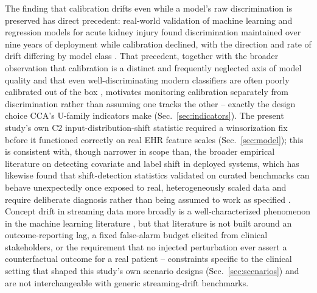 \documentclass[apajournal,article,submit,oneauthor]{Definitions/mdpi}
\begin{document}
The finding that calibration drifts even while a model's raw discrimination is preserved has direct precedent: real-world validation of machine learning and regression models for acute kidney injury found discrimination maintained over nine years of deployment while calibration declined, with the direction and rate of drift differing by model class \citep{davis2017}. That precedent, together with the broader observation that calibration is a distinct and frequently neglected axis of model quality \citep{vancalster2019} and that even well-discriminating modern classifiers are often poorly calibrated out of the box \citep{guo2017}, motivates monitoring calibration separately from discrimination rather than assuming one tracks the other -- exactly the design choice CCA's U-family indicators make (Sec.~\ref{sec:indicators}). The present study's own C2 input-distribution-shift statistic required a winsorization fix before it functioned correctly on real EHR feature scales (Sec.~\ref{sec:model}); this is consistent with, though narrower in scope than, the broader empirical literature on detecting covariate and label shift in deployed systems, which has likewise found that shift-detection statistics validated on curated benchmarks can behave unexpectedly once exposed to real, heterogeneously scaled data and require deliberate diagnosis rather than being assumed to work as specified \citep{rabanser2019}. Concept drift in streaming data more broadly is a well-characterized phenomenon in the machine learning literature \citep{gama2014,lu2019}, but that literature is not built around an outcome-reporting lag, a fixed false-alarm budget elicited from clinical stakeholders, or the requirement that no injected perturbation ever assert a counterfactual outcome for a real patient -- constraints specific to the clinical setting that shaped this study's own scenario designs (Sec.~\ref{sec:scenarios}) and are not interchangeable with generic streaming-drift benchmarks.
\end{document}
